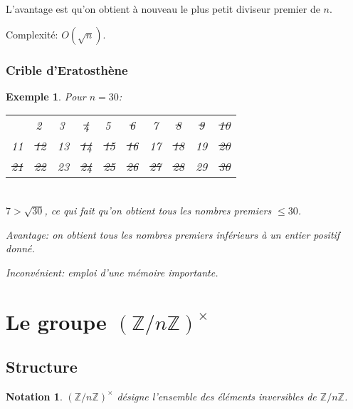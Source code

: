 \documentclass[10pt,a4paper]{report}
\newtheorem*{ex}{Exemple}
\newtheorem*{prop}{Proposition}
\newtheorem*{nota}{Notation}
\begin{document}
L'avantage est qu'on obtient à nouveau le plus petit diviseur premier de $n$. \par 
Complexité: $O(\sqrt{n})$.

\subsubsection*{Crible d'Eratosthène}


\begin{ex}
Pour $n=30$: \\
\begin{tabular}{cccccccccc}
  & \textcircled{2} & \textcircled{3} & \sout{4} & \textcircled{5} & \sout{6} & 7& \sout{8} & \sout{9} & \sout{10}  \\
   11 & \sout{12} & 13 & \sout{14} & \sout{15} & \sout{16} & 17 &\sout{18} & 19 & \sout{20}\\
   \sout{21} & \sout{22} & 23 & \sout{24} & \sout{25} & \sout{26} & \sout{27} & \sout{28} & 29 & \sout{30}
\end{tabular}\\
$7 > \sqrt{30}$, ce qui fait qu'on obtient tous les nombres premiers $\leqslant 30$.\par  Avantage: on obtient tous les nombres premiers inférieurs à un entier positif donné.\par 
Inconvénient: emploi d'une mémoire importante.
\end{ex}


\section{Le groupe $(\mathbb{Z}/n\mathbb{Z})^{\times}$}

\subsection{Structure}


\begin{nota}
$(\mathbb{Z}/n\mathbb{Z})^{\times}$ désigne l'ensemble des éléments inversibles de $\mathbb{Z}/n\mathbb{Z}$.
\end{nota}
\end{document}
